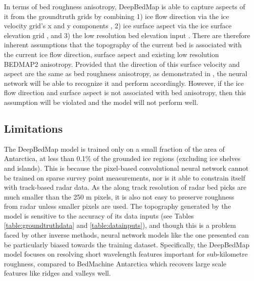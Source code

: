\documentclass[tc, manuscript]{copernicus}
\begin{document}
In terms of bed roughness anisotropy, DeepBedMap is able to capture aspects of it from the groundtruth grids by combining 1) ice flow direction via the ice velocity grid's x and y components \citep{MouginotMEaSUREsPhaseMap2019}, 2) ice surface aspect via the ice surface elevation grid \citep{HowatReferenceElevationModel2019}, and 3) the low resolution bed elevation input \citep{FretwellBedmap2improvedice2013}.
There are therefore inherent assumptions that the topography of the current bed is associated with the current ice flow direction, surface aspect and existing low resolution BEDMAP2 anisotropy.
Provided that the direction of this surface velocity and aspect are the same as bed roughness anisotropy, as demonstrated in \citet{HolschuhLinkingpostglaciallandscapes2020}, the neural network will be able to recognize it and perform accordingly.
However, if the ice flow direction and surface aspect is not associated with bed anisotropy, then this assumption will be violated and the model will not perform well.

\subsection{Limitations}

The DeepBedMap model is trained only on a small fraction of the area of Antarctica, at less than 0.1\% of the grounded ice regions (excluding ice shelves and islands).
This is because the pixel-based convolutional neural network cannot be trained on sparse survey point measurements, nor is it able to constrain itself with track-based radar data.
As the along track resolution of radar bed picks are much smaller than the 250 m pixels, it is also not easy to preserve roughness from radar unless smaller pixels are used.
The topography generated by the model is sensitive to the accuracy of its data inputs (see Tables \ref{table:groundtruthdata} and \ref{table:datainputs}), and though this is a problem faced by other inverse methods, neural network models like the one presented can be particularly biased towards the training dataset.
Specifically, the DeepBedMap model focuses on resolving short wavelength features important for sub-kilometre roughness, compared to BedMachine Antarctica \citep{MorlighemDeepglacialtroughs2019} which recovers large scale features like ridges and valleys well.
\end{document}
